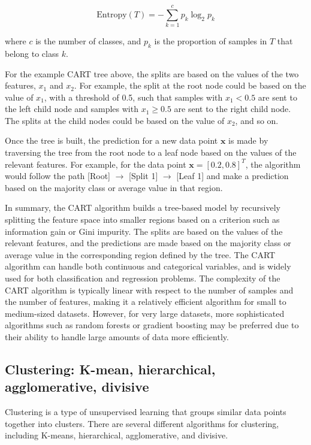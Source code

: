 \documentclass[12pt, a4paper, oneside]{article}
\begin{document}
$$\text{Entropy}(T) = - \sum_{k=1}^{c} p_k \log_2 p_k$$

where $c$ is the number of classes, and $p_k$ is the proportion of samples in $T$ that belong to class $k$.

For the example CART tree above, the splits are based on the values of the two features, $x_{1}$ and $x_{2}$. For example, the split at the root node could be based on the value of $x_{1}$, with a threshold of 0.5, such that samples with $x_{1} < 0.5$ are sent to the left child node and samples with $x_{1} \ge 0.5$ are sent to the right child node. The splits at the child nodes could be based on the value of $x_{2}$, and so on.

Once the tree is built, the prediction for a new data point $\mathbf{x}$ is made by traversing the tree from the root node to a leaf node based on the values of the relevant features. For example, for the data point $\mathbf{x} = [0.2, 0.8]^T$, the algorithm would follow the path [Root] $\to$ [Split 1] $\to$ [Leaf 1] and make a prediction based on the majority class or average value in that region.

In summary, the CART algorithm builds a tree-based model by recursively splitting the feature space into smaller regions based on a criterion such as information gain or Gini impurity. The splits are based on the values of the relevant features, and the predictions are made based on the majority class or average value in the
corresponding region defined by the tree. The CART algorithm can handle both continuous and categorical variables, and is widely used for both classification and regression problems. The complexity of the CART algorithm is typically linear with respect to the number of samples and the number of features, making it a relatively efficient algorithm for small to medium-sized datasets. However, for very large datasets, more sophisticated algorithms such as random forests or gradient boosting may be preferred due to their ability to handle large amounts of data more efficiently.






\subsection{ Clustering: K-mean, hierarchical, agglomerative, divisive }

Clustering is a type of unsupervised learning that groups similar data points together into clusters. There are several different algorithms for clustering, including K-means, hierarchical, agglomerative, and divisive.
\end{document}
